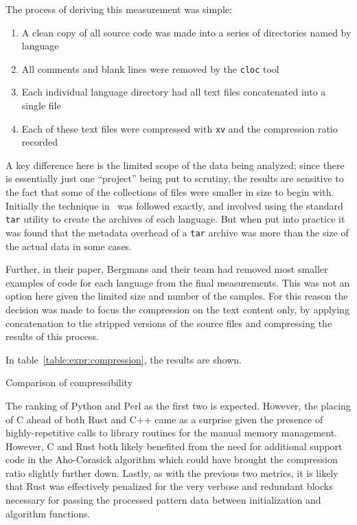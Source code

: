 The process of deriving this measurement was simple:

\begin{enumerate}
\item A clean copy of all source code was made into a series of directories named by language
\item All comments and blank lines were removed by the \texttt{cloc} tool
\item Each individual language directory had all text files concatenated into a single file
\item Each of these text files were compressed with \texttt{xv} and the compression ratio recorded
\end{enumerate}

A key difference here is the limited scope of the data being analyzed; since there is essentially just one ``project'' being put to scrutiny, the results are sensitive to the fact that some of the collections of files were smaller in size to begin with. Initially the technique in~\cite{bergmans} was followed exactly, and involved using the standard \texttt{tar} utility to create the archives of each language. But when put into practice it was found that the metadata overhead of a \texttt{tar} archive was more than the size of the actual data in some cases.

Further, in their paper, Bergmans and their team had removed most smaller examples of code for each language from the final measurements. This was not an option here given the limited size and number of the samples. For this reason the decision was made to focus the compression on the text content only, by applying concatenation to the stripped versions of the source files and compressing the results of this process.

In table~\ref{table:expr:compression}, the results are shown.

\begin{table}[!htb]

\caption{Comparison of compressibility}
\label{table:expr:compression}
\end{table}

The ranking of Python and Perl as the first two is expected. However, the placing of C ahead of both Rust and C++ came as a surprise given the presence of highly-repetitive calls to library routines for the manual memory management. However, C and Rust both likely benefited from the need for additional support code in the Aho-Corasick algorithm which could have brought the compression ratio slightly further down. Lastly, as with the previous two metrics, it is likely that Rust was effectively penalized for the very verbose and redundant blocks necessary for passing the processed pattern data between initialization and algorithm functions.


